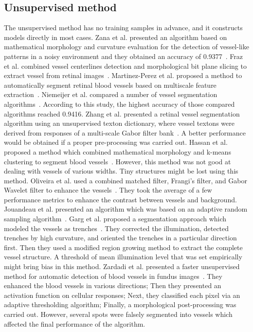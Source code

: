 \documentclass[journal]{IEEEtran}
\begin{document}
\subsection{Unsupervised method}
The unsupervised method has no training samples in advance, and it constructs models directly in most cases. Zana et al. presented an algorithm based on mathematical morphology and curvature evaluation for the detection of vessel-like patterns in a noisy environment and they obtained an accuracy of 0.9377~\cite{zana_segmentation_2001}. Fraz et al. combined vessel centerlines detection and morphological bit plane slicing to extract vessel from retinal images~\cite{fraz_approach_2012}. Martinez-Perez et al. proposed a method to automatically segment retinal blood vessels based on multiscale feature extraction~\cite{martinez-perez_segmentation_2007}. Niemeijer et al. compared a number of vessel segmentation algorithms~\cite{niemeijer_comparative_2004}. According to this study, the highest accuracy of those compared algorithms reached 0.9416. Zhang et al. presented a retinal vessel segmentation algorithm using an unsupervised texton dictionary, where vessel textons were derived from responses of a multi-scale Gabor filter bank~\cite{zhang_retinal_2015}. A better performance would be obtained if a proper pre-processing was carried out. Hassan et al. proposed a method which combined mathematical morphology and k-means clustering to segment blood vessels~\cite{hassan_retinal_2015}. However, this method was not good at dealing with vessels of various widths. Tiny structures might be lost using this method. Oliveira et al. used a combined matched filter, Frangi's filter, and Gabor Wavelet filter to enhance the vessels~\cite{oliveira_unsupervised_2016}. They took the average of a few performance metrics to enhance the contrast between vessels and background. Jouandeau et al. presented an algorithm which was based on an adaptive random sampling algorithm~\cite{jouandeau_retinal_2014}. Garg et al. proposed a segmentation approach which modeled the vessels as trenches~\cite{garg_unsupervised_2007}. They corrected the illumination, detected trenches by high curvature, and oriented the trenches in a particular direction first. Then they used a modified region growing method to extract the complete vessel structure. A threshold of mean illumination level that was set empirically might bring bias in this method. Zardadi et al. presented a faster unsupervised method for automatic detection of blood vessels in fundus images~\cite{zardadi_unsupervised_2016}. They enhanced the blood vessels in various directions; Then they presented an activation function on cellular responses; Next, they classified each pixel via an adaptive thresholding algorithm; Finally, a morphological post-processing was carried out. However, several spots were falsely segmented into vessels which affected the final performance of the algorithm.
\end{document}
